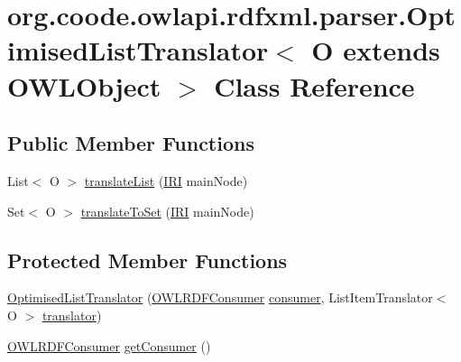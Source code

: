 \hypertarget{classorg_1_1coode_1_1owlapi_1_1rdfxml_1_1parser_1_1_optimised_list_translator_3_01_o_01extends_01_o_w_l_object_01_4}{\section{org.\-coode.\-owlapi.\-rdfxml.\-parser.\-Optimised\-List\-Translator$<$ O extends O\-W\-L\-Object $>$ Class Reference}
\label{classorg_1_1coode_1_1owlapi_1_1rdfxml_1_1parser_1_1_optimised_list_translator_3_01_o_01extends_01_o_w_l_object_01_4}
}
\subsection*{Public Member Functions}
\begin{DoxyCompactItemize}
\item 
List$<$ O $>$ \hyperlink{classorg_1_1coode_1_1owlapi_1_1rdfxml_1_1parser_1_1_optimised_list_translator_3_01_o_01extends_01_o_w_l_object_01_4_aa1bc5e022dc644f872ba6468ded92190}{translate\-List} (\hyperlink{classorg_1_1semanticweb_1_1owlapi_1_1model_1_1_i_r_i}{I\-R\-I} main\-Node)
\item 
Set$<$ O $>$ \hyperlink{classorg_1_1coode_1_1owlapi_1_1rdfxml_1_1parser_1_1_optimised_list_translator_3_01_o_01extends_01_o_w_l_object_01_4_a48f1902a34fe9f8d62cdb0575a5f60cd}{translate\-To\-Set} (\hyperlink{classorg_1_1semanticweb_1_1owlapi_1_1model_1_1_i_r_i}{I\-R\-I} main\-Node)
\end{DoxyCompactItemize}
\subsection*{Protected Member Functions}
\begin{DoxyCompactItemize}
\item 
\hyperlink{classorg_1_1coode_1_1owlapi_1_1rdfxml_1_1parser_1_1_optimised_list_translator_3_01_o_01extends_01_o_w_l_object_01_4_a08c059a96a5df060e9e93a839ed61f79}{Optimised\-List\-Translator} (\hyperlink{classorg_1_1coode_1_1owlapi_1_1rdfxml_1_1parser_1_1_o_w_l_r_d_f_consumer}{O\-W\-L\-R\-D\-F\-Consumer} \hyperlink{classorg_1_1coode_1_1owlapi_1_1rdfxml_1_1parser_1_1_optimised_list_translator_3_01_o_01extends_01_o_w_l_object_01_4_a013817e4f5126b4c65babe9d40ff4a42}{consumer}, List\-Item\-Translator$<$ O $>$ \hyperlink{classorg_1_1coode_1_1owlapi_1_1rdfxml_1_1parser_1_1_optimised_list_translator_3_01_o_01extends_01_o_w_l_object_01_4_a521d828eda75fbc3a5bf878b0bb98286}{translator})
\item 
\hyperlink{classorg_1_1coode_1_1owlapi_1_1rdfxml_1_1parser_1_1_o_w_l_r_d_f_consumer}{O\-W\-L\-R\-D\-F\-Consumer} \hyperlink{classorg_1_1coode_1_1owlapi_1_1rdfxml_1_1parser_1_1_optimised_list_translator_3_01_o_01extends_01_o_w_l_object_01_4_abdfb994cdbe8ddb927ed74cb5d9cca79}{get\-Consumer} ()
\end{DoxyCompactItemize}
